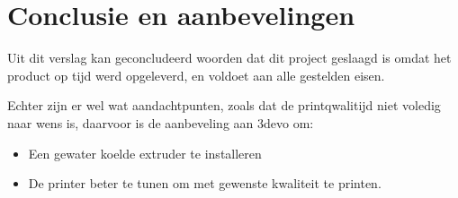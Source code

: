 \chapter{Conclusie en aanbevelingen}
\label{Conclusie_en_aanbevelingen}

Uit dit verslag kan geconcludeerd woorden dat dit project geslaagd is omdat het
product op tijd werd opgeleverd, en voldoet aan alle gestelden eisen.

Echter zijn er wel wat aandachtpunten, zoals dat de printqwalitijd niet voledig
naar wens is, daarvoor is de aanbeveling aan 3devo om:

\begin{itemize}
    \item Een gewater koelde extruder te installeren
    \item De printer beter te tunen om met gewenste kwaliteit te printen.
\end{itemize}